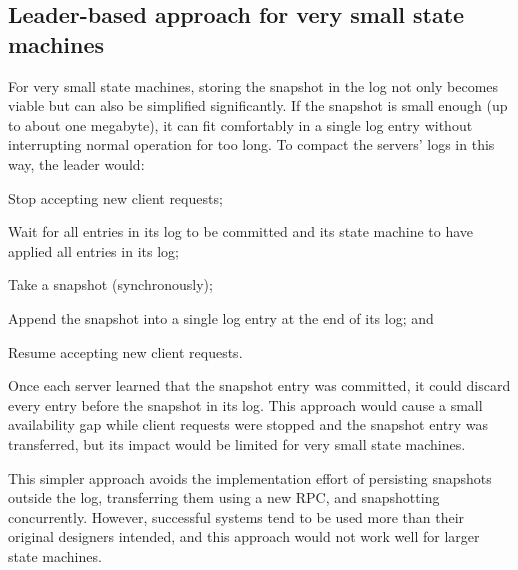 \subsection{Leader-based approach for very small state machines}

For very small state machines, storing the snapshot in the log not only
becomes viable but can also be simplified significantly. If the snapshot
is small enough (up to about one megabyte), it can fit comfortably in a
single log entry without interrupting normal operation for too long. To
compact the servers' logs in this way, the leader would:
\vspace{2ex}
\begin{compactenum}
\item Stop accepting new client requests;
\item Wait for all entries in its log to be committed and its state
machine to have applied all entries in its log;
\item Take a snapshot (synchronously);
\item Append the snapshot into a single log entry at the end of its log; and
\item Resume accepting new client requests.
\end{compactenum}
Once each server learned that the snapshot entry was committed, it could
discard every entry before the snapshot in its log. This approach would
cause a small availability gap while client requests were stopped and the
snapshot entry was transferred, but its impact would be limited for very
small state machines.

This simpler approach avoids
the implementation effort of persisting snapshots outside the log,
transferring them using a new RPC, and snapshotting concurrently.
However, successful systems tend to be used more than their original
designers intended, and this approach would not work well for larger
state machines.
